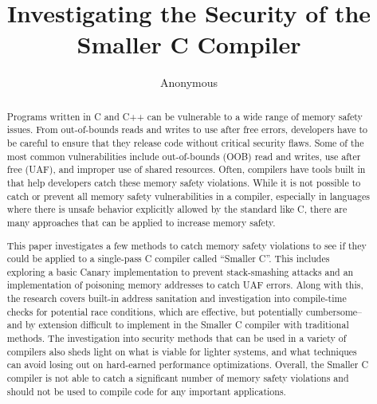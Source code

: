 \documentclass[sigconf, anonymous]{acmart}
\begin{document}
\title{Investigating the Security of the Smaller C Compiler}

\author{Anonymous}

\begin{abstract}

Programs written in C and C++ can be vulnerable to a wide range of memory safety issues. From out-of-bounds reads and writes to use after free errors, developers have to be careful to ensure that they release code without critical security flaws. Some of the most common vulnerabilities include out-of-bounds (OOB) read and writes, use after free (UAF), and improper use of shared resources. Often, compilers have tools built in that help developers catch these memory safety violations. While it is not possible to catch or prevent all memory safety vulnerabilities in a compiler, especially in languages where there is unsafe behavior explicitly allowed by the standard like C, there are many approaches that can be applied to increase memory safety.

This paper investigates a few methods to catch memory safety violations to see if they could be applied to a single-pass C compiler called “Smaller C”. This includes exploring a basic Canary implementation to prevent stack-smashing attacks and an implementation of poisoning memory addresses to catch UAF errors. Along with this, the research covers built-in address sanitation and investigation into compile-time checks for potential race conditions, which are effective, but potentially cumbersome– and by extension difficult to implement in the Smaller C compiler with traditional methods. The investigation into security methods that can be used in a variety of compilers also sheds light on what is viable for lighter systems, and what techniques can avoid losing out on hard-earned performance optimizations. Overall, the Smaller C compiler is not able to catch a significant number of memory safety violations and should not be used to compile code for any important applications.

\end{abstract}


\maketitle
\end{document}
